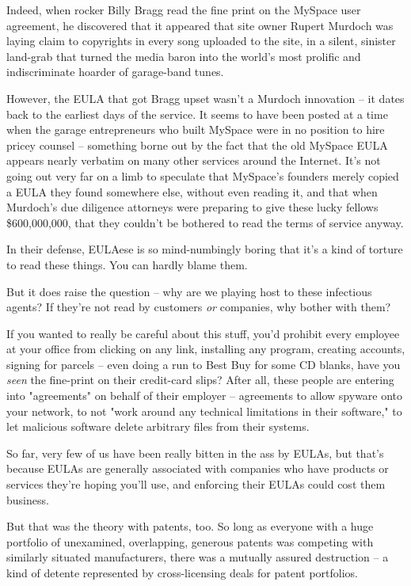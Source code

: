 Indeed, when rocker Billy Bragg read the fine print on the MySpace
user agreement, he discovered that it appeared that site owner
Rupert Murdoch was laying claim to copyrights in every song
uploaded to the site, in a silent, sinister land-grab that turned
the media baron into the world's most prolific and indiscriminate
hoarder of garage-band tunes.

However, the EULA that got Bragg upset wasn't a Murdoch innovation
-- it dates back to the earliest days of the service. It seems to
have been posted at a time when the garage entrepreneurs who built
MySpace were in no position to hire pricey counsel -- something
borne out by the fact that the old MySpace EULA appears nearly
verbatim on many other services around the Internet. It's not going
out very far on a limb to speculate that MySpace's founders merely
copied a EULA they found somewhere else, without even reading it,
and that when Murdoch's due diligence attorneys were preparing to
give these lucky fellows \$600,000,000, that they couldn't be
bothered to read the terms of service anyway.

In their defense, EULAese is so mind-numbingly boring that it's a
kind of torture to read these things. You can hardly blame them.

But it does raise the question -- why are we playing host to these
infectious agents? If they're not read by customers \emph{or}
companies, why bother with them?

If you wanted to really be careful about this stuff, you'd prohibit
every employee at your office from clicking on any link, installing
any program, creating accounts, signing for parcels -- even doing a
run to Best Buy for some CD blanks, have you \emph{seen} the
fine-print on their credit-card slips? After all, these people are
entering into "agreements" on behalf of their employer --
agreements to allow spyware onto your network, to not "work around
any technical limitations in their software," to let malicious
software delete arbitrary files from their systems.

So far, very few of us have been really bitten in the ass by EULAs,
but that's because EULAs are generally associated with companies
who have products or services they're hoping you'll use, and
enforcing their EULAs could cost them business.

But that was the theory with patents, too. So long as everyone with
a huge portfolio of unexamined, overlapping, generous patents was
competing with similarly situated manufacturers, there was a
mutually assured destruction -- a kind of detente represented by
cross-licensing deals for patent portfolios.

